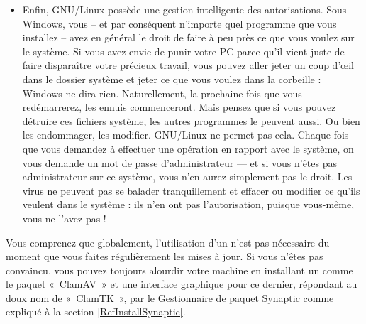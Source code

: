 \begin{itemize}
\item Enfin, GNU/Linux possède une gestion intelligente des autorisations. Sous Windows, vous -- et par conséquent n'importe quel programme que vous installez -- avez en général le droit de faire à peu près ce que vous voulez sur le système. Si vous avez envie de punir votre PC parce qu'il vient juste de faire disparaître votre précieux travail, vous pouvez aller jeter un coup d'œil dans le dossier système et jeter ce que vous voulez dans la corbeille : Windows ne dira rien. Naturellement, la prochaine fois que vous redémarrerez, les ennuis commenceront. Mais pensez que si vous pouvez détruire ces fichiers système, les autres programmes le peuvent aussi. Ou bien les endommager, les modifier. GNU/Linux ne permet pas cela. Chaque fois que vous demandez à effectuer une opération en rapport avec le système, on vous demande un mot de passe d'administrateur --- et si vous n'êtes pas administrateur sur ce système, vous n'en aurez simplement pas le droit. Les virus ne peuvent pas se balader tranquillement et effacer ou modifier ce qu'ils veulent dans le système : ils n'en ont pas l'autorisation, puisque vous-même, vous ne l'avez pas !
\end{itemize}
Vous comprenez que globalement, l'utilisation d'un  n'est pas nécessaire du moment que vous faites régulièrement les mises à jour. Si vous n'êtes pas convaincu, vous pouvez toujours alourdir votre machine en installant un  comme le paquet «~ClamAV~» et une interface graphique pour ce dernier, répondant au doux nom de «~ClamTK~», par le Gestionnaire de paquet Synaptic comme expliqué à la section \ref{RefInstallSynaptic}.
